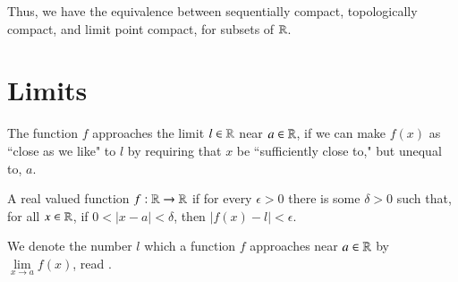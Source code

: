 Thus, we have the equivalence between sequentially compact, topologically compact, and limit point compact, for subsets of $\mathbb R$.

\section{Limits}

\begin{rmk}
    The function $f$ approaches the limit $l \in \mathbb R$ near $a \in \mathbb R$, if we can make $f(x)$ as ``close as we like" to $l$ by requiring that $x$ be ``sufficiently close to," but unequal to, $a.$
\end{rmk}

\begin{defn}[Limit]
    A real valued function $f:\mathbb R\rightarrow \mathbb R$  if for every $\epsilon > 0$ there is some $\delta > 0$ such that, for all $x \in \mathbb R$, if $0 < |x-a| < \delta$, then $|f(x) - l| < \epsilon$.
\end{defn}

\begin{nota}
    We denote the number $l$ which a function $f$ approaches near $a \in \mathbb R$ by $\lim\limits_{x\rightarrow a}f(x)$, read .
\end{nota}



